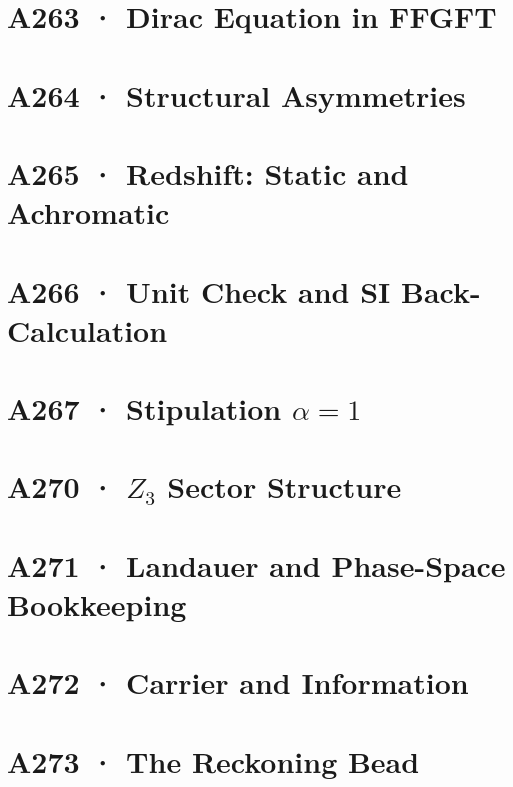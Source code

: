 \documentclass[11pt,twoside,openright]{book}
\begin{document}
\chapter[A263 · Dirac Equation]{A263 · Dirac Equation in FFGFT}


\chapter[A264 · Structural Asymmetries]{A264 · Structural Asymmetries}


\chapter[A265 · Redshift]{A265 · Redshift: Static and Achromatic}


\chapter[A266 · Unit Check]{A266 · Unit Check and SI Back-Calculation}


\chapter[A267 · Stipulation $\alpha=1$]{A267 · Stipulation $\alpha=1$}


\chapter[A270 · $Z_3$ Sector Structure]{A270 · $Z_3$ Sector Structure}


\chapter[A271 · Landauer and Phase Space]{A271 · Landauer and Phase-Space Bookkeeping}


\chapter[A272 · Carrier and Information]{A272 · Carrier and Information}


\chapter[A273 · The Reckoning Bead]{A273 · The Reckoning Bead}

\end{document}
